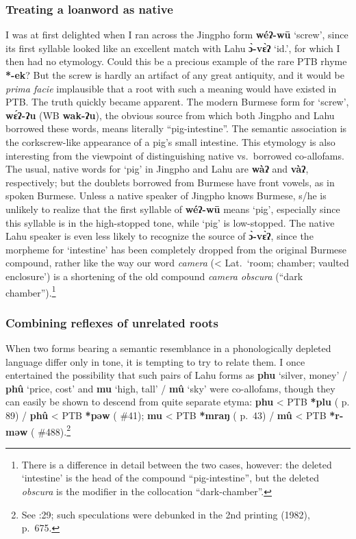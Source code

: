 \subsubsection{Treating a loanword as native}

I was at first delighted when I ran across the Jingpho form \textbf{wéʔ-wū} ‘screw’,
since its first syllable looked like an excellent match with Lahu \textbf{ɔ̀-vɛ̀ʔ} ‘id.’,
for which I then had no etymology. Could this be a precious example of the rare
PTB rhyme \textbf{*-ek}? But the screw is hardly an artifact of any great antiquity, and
it would be \textit{prima facie} implausible that a root with such a meaning would have
existed in PTB. The truth quickly became apparent. The modern Burmese form for
‘screw’, \textbf{wɛ́ʔ-ʔu} (WB \textbf{wak-ʔu}), the obvious source from which both Jingpho and
Lahu borrowed these words, means literally “pig-intestine”.  The semantic
association is the corkscrew-like appearance of a pig’s small intestine. This
etymology is also interesting from the viewpoint of distinguishing native vs.\
borrowed co-allofams. The usual, native words for ‘pig’ in Jingpho and Lahu are
\textbf{wàʔ} and \textbf{vàʔ}, respectively; but the doublets borrowed from Burmese have front
vowels, as in spoken Burmese. Unless a native speaker of Jingpho knows Burmese,
s/he is unlikely to realize that the first syllable of \textbf{wéʔ-wū} means ‘pig’,
especially since this syllable is in the high-stopped tone, while ‘pig’ is
low-stopped. The native Lahu speaker is even less likely to recognize the source
of \textbf{ɔ̀-vɛ̀ʔ}, since the morpheme for ‘intestine’ has been completely dropped from
the original Burmese compound, rather like the way our word \textit{camera} (< Lat.\
‘room; chamber; vaulted enclosure’) is a shortening of the old compound \textit{camera
obscura} (“dark chamber”).\footnote{There is a difference in detail between the
two cases, however: the deleted ‘intestine’ is the head of the compound
“pig-intestine”, but the deleted \textit{obscura} is the modifier in the collocation
“dark-chamber”.}

\subsubsection{Combining reflexes of unrelated roots}

When two forms bearing a semantic resemblance in a phonologically depleted
language differ only in tone, it is tempting to try to relate them. I once
entertained the possibility that such pairs of Lahu forms as \textbf{phu} ‘silver, money’
/ \textbf{phû} ‘price, cost’ and \textbf{mu} ‘high, tall’ / \textbf{mû} ‘sky’ were co-allofams, though they
can easily be shown to descend from quite separate etyma: \textbf{phu} < PTB \textbf{*plu} (\textit{} p.
89) / \textbf{phû} < PTB \textbf{*pəw} (\textit{\citetalias{STC}} \#41);
\textbf{mu} < PTB \textbf{*mraŋ} (\textit{\citetalias{STC}} p.~43) / \textbf{mû} < PTB \textbf{*r-məw}
(\textit{\citetalias{STC}} \#488).\footnote{See \citealt{JAM-GL}:29; such speculations were debunked in
the 2nd printing (1982), p.~675.}

